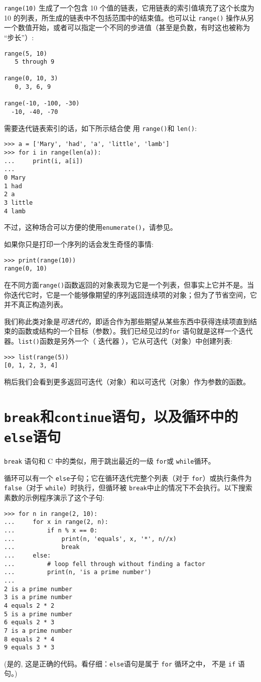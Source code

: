 \texttt{range(10)} 生成了一个包含 10 个值的链表，它用链表的索引值填充了这个长度为 10 的列表，所生成的链表中不包括范围中的结束值。也可以让 \texttt{range()} 操作从另一个数值开始，或者可以指定一个不同的步进值（甚至是负数，有时这也被称为 “步长”）:
\begin{lstlisting}
range(5, 10)
   5 through 9

range(0, 10, 3)
   0, 3, 6, 9

range(-10, -100, -30)
  -10, -40, -70
\end{lstlisting}

需要迭代链表索引的话，如下所示结合使 用 \texttt{range()}和 \texttt{len()}:
\begin{lstlisting}
>>> a = ['Mary', 'had', 'a', 'little', 'lamb']
>>> for i in range(len(a)):
...     print(i, a[i])
...
0 Mary
1 had
2 a
3 little
4 lamb
\end{lstlisting}
不过，这种场合可以方便的使用\texttt{enumerate()}，请参见。

如果你只是打印一个序列的话会发生奇怪的事情:
\begin{lstlisting}
>>> print(range(10))
range(0, 10)
\end{lstlisting}

在不同方面\texttt{range()}函数返回的对象表现为它是一个列表，但事实上它并不是。当你迭代它时，它是一个能够像期望的序列返回连续项的对象；但为了节省空间，它并不真正构造列表。

我们称此类对象是\emph{可迭代的}，即适合作为那些期望从某些东西中获得连续项直到结束的函数或结构的一个目标（参数）。我们已经见过的\texttt{for} 语句就是这样一个迭代器。\texttt{list()}函数是另外一个（ 迭代器 ），它从可迭代（对象）中创建列表:
\begin{lstlisting}
>>> list(range(5))
[0, 1, 2, 3, 4]
\end{lstlisting}

稍后我们会看到更多返回可迭代（对象）和以可迭代（对象）作为参数的函数。
\section{\texttt{break}和\texttt{continue}语句，以及循环中的\texttt{else}语句}
\texttt{break} 语句和 C 中的类似，用于跳出最近的一级 \texttt{for}或 \texttt{while}循环。

循环可以有一个 \texttt{else}子句；它在循环迭代完整个列表（对于 \texttt{for}）或执行条件为 \texttt{false}（对于 \texttt{while}）时执行，但循环被 \texttt{break}中止的情况下不会执行。以下搜索素数的示例程序演示了这个子句:
\begin{lstlisting}
>>> for n in range(2, 10):
...     for x in range(2, n):
...         if n % x == 0:
...             print(n, 'equals', x, '*', n//x)
...             break
...     else:
...         # loop fell through without finding a factor
...         print(n, 'is a prime number')
...
2 is a prime number
3 is a prime number
4 equals 2 * 2
5 is a prime number
6 equals 2 * 3
7 is a prime number
8 equals 2 * 4
9 equals 3 * 3
\end{lstlisting}
(是的, 这是正确的代码。看仔细：\texttt{else}语句是属于 \texttt{for} 循环之中， 不是 \texttt{if} 语句。)

